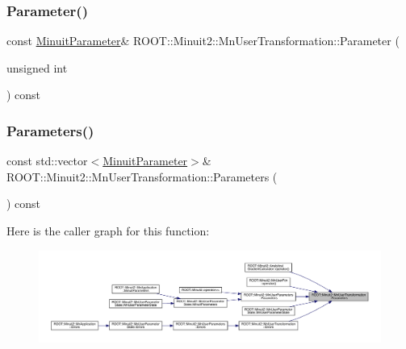 \subsubsection{\texorpdfstring{Parameter()}{Parameter()}\hspace{0.1cm}{\footnotesize\ttfamily [3/3]}}
{\footnotesize\ttfamily const \mbox{\hyperlink{classROOT_1_1Minuit2_1_1MinuitParameter}{Minuit\+Parameter}}\& R\+O\+O\+T\+::\+Minuit2\+::\+Mn\+User\+Transformation\+::\+Parameter (\begin{DoxyParamCaption}\item[{unsigned int}]{ }\end{DoxyParamCaption}) const}

\mbox{\label{classROOT_1_1Minuit2_1_1MnUserTransformation_a29366e4f3594d0cf3b5d4dc0b1597ad6}} 
\subsubsection{\texorpdfstring{Parameters()}{Parameters()}\hspace{0.1cm}{\footnotesize\ttfamily [1/3]}}
{\footnotesize\ttfamily const std\+::vector$<$\mbox{\hyperlink{classROOT_1_1Minuit2_1_1MinuitParameter}{Minuit\+Parameter}}$>$\& R\+O\+O\+T\+::\+Minuit2\+::\+Mn\+User\+Transformation\+::\+Parameters (\begin{DoxyParamCaption}{ }\end{DoxyParamCaption}) const\hspace{0.3cm}{\ttfamily [inline]}}

Here is the caller graph for this function\+:
\nopagebreak
\begin{figure}[H]
\begin{center}
\leavevmode
\includegraphics[width=350pt]{d9/d98/classROOT_1_1Minuit2_1_1MnUserTransformation_a29366e4f3594d0cf3b5d4dc0b1597ad6_icgraph}
\end{center}
\end{figure}
\mbox{\label{classROOT_1_1Minuit2_1_1MnUserTransformation_a29366e4f3594d0cf3b5d4dc0b1597ad6}} 
